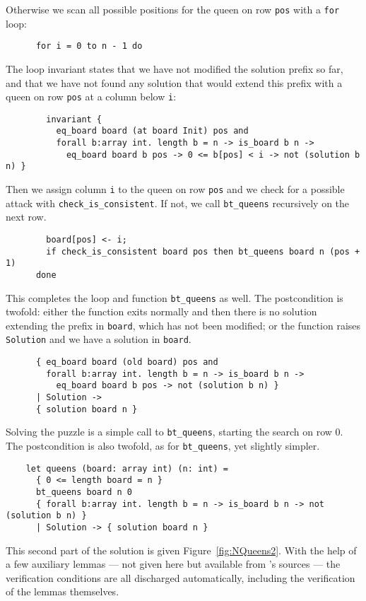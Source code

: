 Otherwise we scan all possible positions for the queen on row
\texttt{pos} with a \texttt{for} loop:
\begin{verbatim}
      for i = 0 to n - 1 do
\end{verbatim}
The loop invariant states that we have not modified the solution
prefix so far, and that we have not found any solution that would
extend this prefix with a queen on row \texttt{pos} at a column below
\texttt{i}:
\begin{verbatim}
        invariant {
          eq_board board (at board Init) pos and
          forall b:array int. length b = n -> is_board b n ->
            eq_board board b pos -> 0 <= b[pos] < i -> not (solution b n) }
\end{verbatim}
Then we assign column \texttt{i} to the queen on row \texttt{pos} and
we check for a possible attack with \verb|check_is_consistent|. If
not, we call \verb|bt_queens| recursively on the next row.
\begin{verbatim}
        board[pos] <- i;
        if check_is_consistent board pos then bt_queens board n (pos + 1)
      done
\end{verbatim}
This completes the loop and function \verb|bt_queens| as well.
The postcondition is twofold: either the function exits normally and
then there is no solution extending the prefix in \texttt{board},
which has not been modified;
or the function raises \texttt{Solution} and we have a solution in
\texttt{board}.
\begin{verbatim}
      { eq_board board (old board) pos and
        forall b:array int. length b = n -> is_board b n ->
          eq_board board b pos -> not (solution b n) }
      | Solution ->
      { solution board n }
\end{verbatim}
Solving the puzzle is a simple call to \verb|bt_queens|, starting the
search on row 0. The postcondition is also twofold, as for
\verb|bt_queens|, yet slightly simpler.
\begin{verbatim}
    let queens (board: array int) (n: int) =
      { 0 <= length board = n }
      bt_queens board n 0
      { forall b:array int. length b = n -> is_board b n -> not (solution b n) }
      | Solution -> { solution board n }
\end{verbatim}
This second part of the solution is given Figure~\ref{fig:NQueens2}.
With the help of a few auxiliary lemmas --- not given here but available
from \why's sources --- the verification conditions are all discharged
automatically, including the verification of the lemmas themselves.
